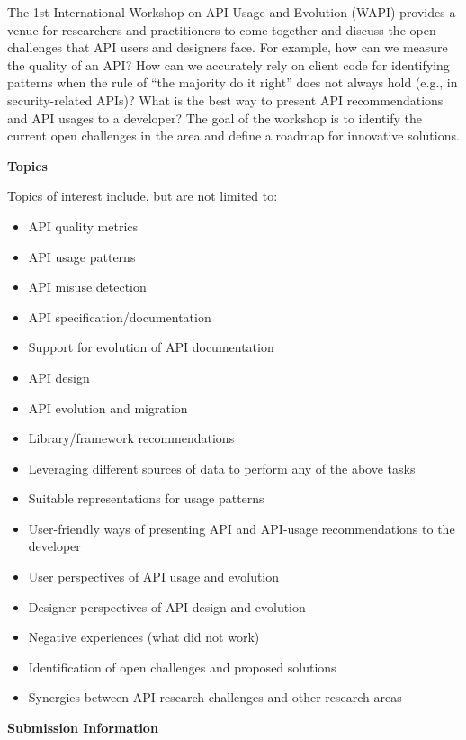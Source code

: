 \documentclass[10pt, conference]{IEEEtran}
\newcommand{\shortname}{WAPI}
\begin{document}
The 1st International Workshop on API Usage and Evolution (\shortname{}) provides a venue for researchers and practitioners to come together and discuss the open challenges that API users and designers face. For example, how can we measure the quality of an API? How can we accurately rely on client code for identifying patterns when the rule of ``the majority do it right'' does not always hold (e.g., in security-related APIs)? What is the best way to present API recommendations and API usages to a developer? The goal of the workshop is to identify the current open challenges in the area and define a roadmap for innovative solutions.


\vspace{0.2cm}

\noindent
\textbf{\large Topics}
\vspace{0.2cm}

Topics of interest include, but are not limited to:
\begin{itemize}
\setlength\itemsep{5pt}

\item API quality metrics
\item API usage patterns
\item API misuse detection
\item API specification/documentation
\item Support for evolution of API documentation
\item API design
\item API evolution and migration
\item Library/framework recommendations
\item Leveraging different sources of data to perform any of the above tasks
\item Suitable representations for usage patterns
\item User-friendly ways of presenting API and API-usage recommendations to the developer
\item User perspectives of API usage and evolution
\item Designer perspectives of API design and evolution
\item Negative experiences (what did not work)
\item Identification of open challenges and proposed solutions
\item Synergies between API-research challenges and other research areas  
\end{itemize}


\vspace{0.2cm}
\noindent
\textbf{\large Submission Information}
\vspace{0.2cm}
\end{document}
